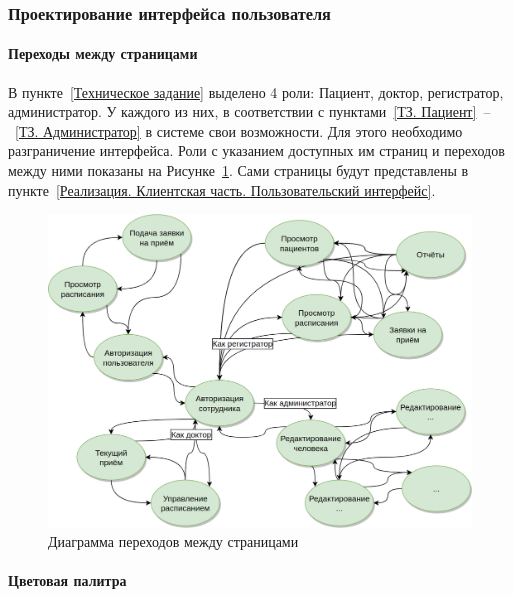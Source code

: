 \documentclass[a4paper,article]{article}
\begin{document}
\begin{sloppypar}
    \subsubsection{Проектирование интерфейса пользователя}
    
    \paragraph{Переходы между страницами}

    В пункте~\ref{Техническое задание} выделено 4 роли: Пациент, доктор, регистратор, администратор. У каждого из них, в соответствии с пунктами~\ref{ТЗ. Пациент}~--~\ref{ТЗ. Администратор} в системе свои возможности. Для этого необходимо разграничение интерфейса. Роли с указанием доступных им страниц и переходов между ними показаны на Рисунке~\ref{fig:Диаграмма переходов между страницами}. Сами страницы будут представлены в пункте~\ref{Реализация. Клиентская часть. Пользовательский интерфейс}.
    
    \begin{figure}[h]
    
        \centering
        
        \includegraphics[width=0.9\linewidth]{Диаграмма переходов между страницами.png}
        
        \caption{\centering Диаграмма переходов между страницами}
        
        \label{fig:Диаграмма переходов между страницами}
        
    \end{figure}
    
    \paragraph{Цветовая палитра}
    

\end{sloppypar}
\end{document}
